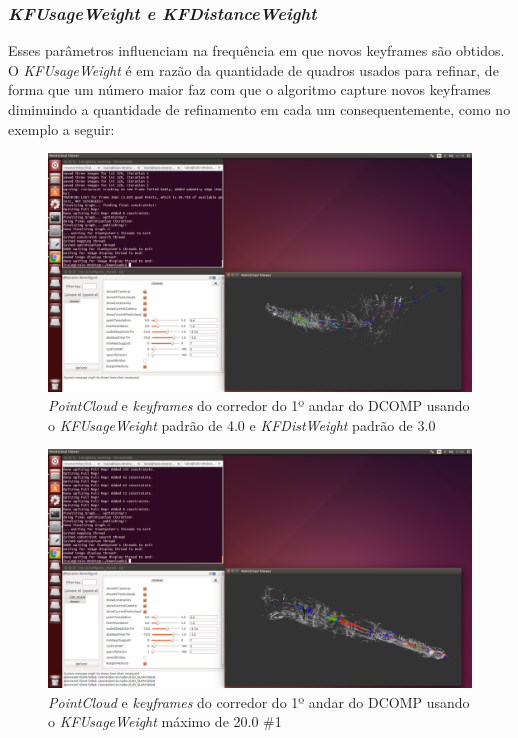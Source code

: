 \subsubsection{\textit{KFUsageWeight e KFDistanceWeight}}


Esses parâmetros influenciam na frequência em que novos keyframes são obtidos. O \textit{KFUsageWeight} é em razão da quantidade de quadros usados para refinar, de forma que um número maior faz com que o algoritmo capture novos keyframes diminuindo a quantidade de refinamento em cada um consequentemente, como no exemplo a seguir:

\begin{figure}[!htb]
	\centering
		\includegraphics[width= \textwidth]{Imagens/figura3-33.png}
	\caption{\textit{PointCloud} e \textit{keyframes} do corredor do 1º andar do DCOMP usando o \textit{KFUsageWeight} padrão de 4.0 e \textit{KFDistWeight} padrão de 3.0}
	\label{fig3:31}
\end{figure}

\begin{figure}[!htb]
	\centering
		\includegraphics[width= \textwidth]{Imagens/figura3-34.png}
	\caption{\textit{PointCloud} e \textit{keyframes} do corredor do 1º andar do DCOMP usando o \textit{KFUsageWeight} máximo de 20.0 \#1}
	\label{fig3:32}
\end{figure}

